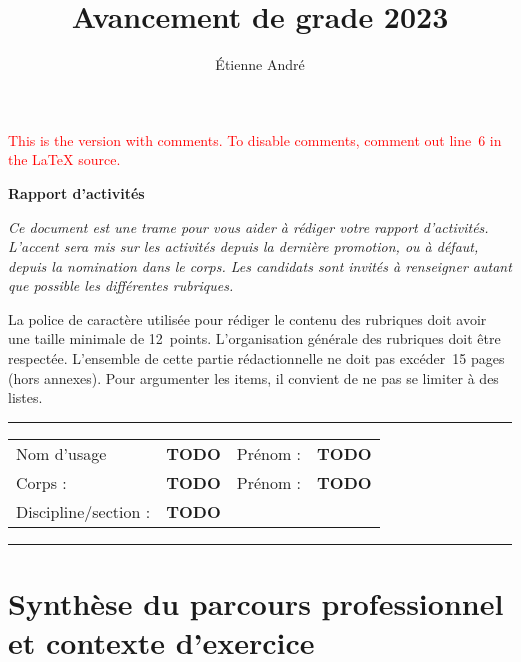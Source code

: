 \documentclass[a4paper,12pt]{article}
\title{Avancement de grade 2023}
\author{Étienne André}
\newcommand{\instructions}[1]{{\color{black}#1}}
\begin{document}
\ifdefined\VersionWithComments

	\textcolor{red}{This is the version with comments.
	To disable comments, comment out line~6 in the \LaTeX{} source.}
	
	\medskip
	
\fi

{
	\Large\bfseries
	\noindent{}Rapport d'activités
}

\bigskip

\instructions{
\em
Ce document est une trame pour vous aider à rédiger votre rapport d'activités. L'accent sera mis sur les activités depuis la dernière promotion, ou à défaut, depuis la nomination dans le corps. Les candidats sont invités à renseigner autant que possible les différentes rubriques.

\bigskip

La police de caractère utilisée pour rédiger le contenu des rubriques doit avoir une taille minimale de 12~points. L'organisation générale des rubriques doit être respectée. L'ensemble de cette partie rédactionnelle ne doit pas excéder~15 pages (hors annexes). Pour argumenter les items, il convient de ne pas se limiter à des listes.

\bigskip
}

\noindent\rule{\textwidth}{2pt}

\medskip

{\em
\def\arraystretch{2}
\noindent{}\begin{tabular}{l l @{\hspace{3em}} l l}
	Nom d'usage & \textbf{TODO} & Prénom : & \textbf{TODO} \\
	Corps : & \textbf{TODO} & Prénom : & \textbf{TODO} \\
	Discipline/section : & \textbf{TODO} \\
\end{tabular}
}

\medskip

\noindent\rule{\textwidth}{2pt}


\section{Synthèse du parcours professionnel et contexte d'exercice}
\end{document}
